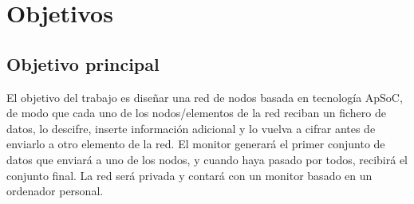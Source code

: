 \chapter{Objetivos}
\section{Objetivo principal}
El objetivo del trabajo es diseñar una red de nodos basada en tecnología ApSoC, de modo que cada uno de los nodos/elementos de la red reciban un fichero de datos, lo descifre, inserte
información adicional y lo vuelva a cifrar antes de enviarlo a otro elemento de la red. El monitor generará el primer conjunto de datos que enviará a uno de los nodos, y cuando haya
pasado por todos, recibirá el conjunto final. La red será privada y contará con un monitor basado en un ordenador personal.


%
